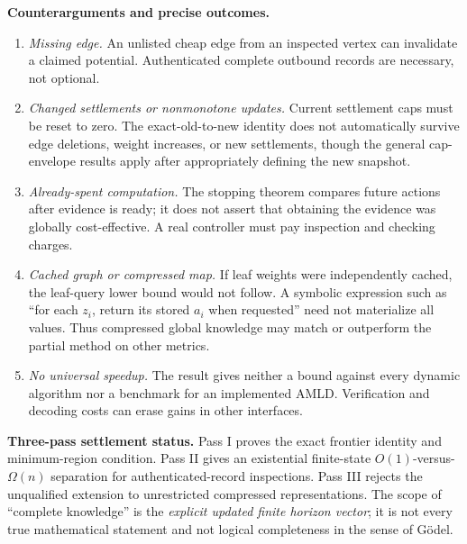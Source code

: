 \documentclass[11pt,letterpaper]{article}
\theoremstyle{definition}
\theoremstyle{remark}
\begin{document}
\textbf{Counterarguments and precise outcomes.}
\begin{enumerate}[label=\roman*.]
\item \emph{Missing edge.} An unlisted cheap edge from an inspected vertex can invalidate a claimed potential. Authenticated complete outbound records are necessary, not optional.
\item \emph{Changed settlements or nonmonotone updates.} Current settlement caps must be reset to zero. The exact-old-to-new identity does not automatically survive edge deletions, weight increases, or new settlements, though the general cap-envelope results apply after appropriately defining the new snapshot.
\item \emph{Already-spent computation.} The stopping theorem compares future actions after evidence is ready; it does not assert that obtaining the evidence was globally cost-effective. A real controller must pay inspection and checking charges.
\item \emph{Cached graph or compressed map.} If leaf weights were independently cached, the leaf-query lower bound would not follow. A symbolic expression such as ``for each $z_i$, return its stored $a_i$ when requested'' need not materialize all values. Thus compressed global knowledge may match or outperform the partial method on other metrics.
\item \emph{No universal speedup.} The result gives neither a bound against every dynamic algorithm nor a benchmark for an implemented AMLD. Verification and decoding costs can erase gains in other interfaces.
\end{enumerate}

\textbf{Three-pass settlement status.} Pass I proves the exact frontier identity and minimum-region condition. Pass II gives an existential finite-state \(O(1)\)-versus-\(\Omega(n)\) separation for authenticated-record inspections. Pass III rejects the unqualified extension to unrestricted compressed representations. The scope of ``complete knowledge'' is the \emph{explicit updated finite horizon vector}; it is not every true mathematical statement and not logical completeness in the sense of G\"odel.
\end{document}
